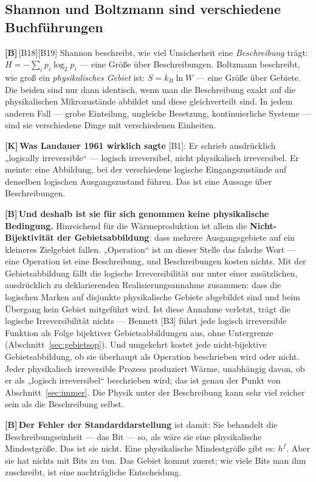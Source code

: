 \documentclass[11pt,a4paper]{article}
\newcommand{\LK}{\textcolor{layK}{\textbf{\footnotesize\textsf{[K]}}}\,}
\newcommand{\LB}{\textcolor{layB}{\textbf{\footnotesize\textsf{[B]}}}\,}
\begin{document}
\subsection{Shannon und Boltzmann sind verschiedene Buchführungen}

\LB [B18][B19] Shannon beschreibt, wie viel Unsicherheit eine \emph{Beschreibung}
trägt: $H = -\sum_i p_i \log_2 p_i$ --- eine Größe über Beschreibungen. Boltzmann
beschreibt, wie groß ein \emph{physikalisches Gebiet} ist: $S = k_B \ln W$ ---
eine Größe über Gebiete. Die beiden sind nur dann identisch, wenn man die
Beschreibung exakt auf die physikalischen Mikrozustände abbildet und diese
gleichverteilt sind. In jedem anderen Fall --- grobe Einteilung, ungleiche
Besetzung, kontinuierliche Systeme --- sind sie verschiedene Dinge mit
verschiedenen Einheiten.

\LK \textbf{Was Landauer 1961 wirklich sagte} [B1]: Er schrieb ausdrücklich
„logically irreversible“ --- logisch irreversibel, nicht physikalisch
irreversibel. Er meinte: eine Abbildung, bei der verschiedene logische
Eingangszustände auf denselben logischen Ausgangszustand führen. Das ist eine
Aussage über Beschreibungen.

\LB \textbf{Und deshalb ist sie für sich genommen keine physikalische Bedingung.}
Hinreichend für die Wärmeproduktion ist allein die \textbf{Nicht-Bijektivität der
Gebietsabbildung}: dass mehrere Ausgangsgebiete auf ein kleineres Zielgebiet
fallen. „Operation“ ist an dieser Stelle das falsche Wort --- eine Operation ist
eine Beschreibung, und Beschreibungen kosten nichts. Mit der Gebietsabbildung
fällt die logische Irreversibilität nur unter einer zusätzlichen, ausdrücklich zu
deklarierenden Realisierungsannahme zusammen: dass die logischen Marken auf
disjunkte physikalische Gebiete abgebildet sind und beim Übergang kein Gebiet
mitgeführt wird. Ist diese Annahme verletzt, trägt die logische Irreversibilität
nichts --- Bennett [B3] führt jede logisch irreversible Funktion als Folge
bijektiver Gebietsabbildungen aus, ohne Untergrenze
(Abschnitt~\ref{sec:gebietsop}). Und umgekehrt kostet jede nicht-bijektive
Gebietsabbildung, ob sie überhaupt als Operation beschrieben wird oder nicht.
Jeder physikalisch irreversible Prozess produziert Wärme, unabhängig davon, ob er
als „logisch irreversibel“ beschrieben wird; das ist genau der Punkt von
Abschnitt~\ref{sec:immer}. Die Physik unter der Beschreibung kann sehr viel
reicher sein als die Beschreibung selbst.

\LB \textbf{Der Fehler der Standarddarstellung} ist damit: Sie behandelt die
Beschreibungseinheit --- das Bit --- so, als wäre sie eine physikalische
Mindestgröße. Das ist sie nicht. Eine physikalische Mindestgröße gibt es: $h^f$.
Aber sie hat nichts mit Bits zu tun. Das Gebiet kommt zuerst; wie viele Bits man
ihm zuschreibt, ist eine nachträgliche Entscheidung.
\end{document}
